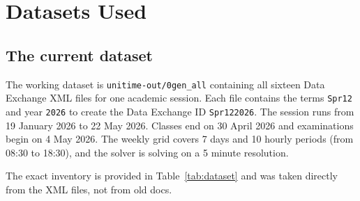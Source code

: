 \section{Datasets Used}
\label{sec:datasets}

\subsection{The current dataset}

The working dataset is \texttt{unitime-out/0gen\_all} containing all sixteen Data Exchange XML files for one academic session.
Each file contains the terms \texttt{Spr12} and year \texttt{2026} to create the Data Exchange ID \texttt{Spr122026}.
The session runs from 19 January 2026 to 22 May 2026. Classes end on 30 April 2026 and examinations begin on 4 May 2026.
The weekly grid covers 7 days and 10 hourly periods (from 08:30 to 18:30), and the solver is solving on a 5 minute resolution.

The exact inventory is provided in Table~\ref{tab:dataset} and was taken directly from the XML files, not from old docs.

